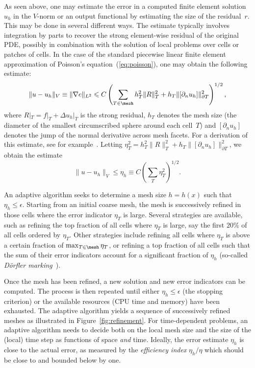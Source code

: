 As seen above, one may estimate the error in a computed finite element
solution~$u_h$ in the $V$-norm or an output functional by estimating
the size of the residual~$r$.  This may be done in several different
ways. The estimate typically involves integration by parts to recover
the strong element-wise residual of the original PDE, possibly in
combination with the solution of local problems over cells or patches
of cells. In the case of the standard piecewise linear finite element
approximation of Poisson's equation~(\ref{eq:poisson}), one may obtain
the following estimate:
\begin{equation}
  \|u - u_h\|_V \equiv \|\nabla e\|_{L^2} \leqslant C
  \left(
  \sum_{T\in\mesh} h_T^2 \|R\|_{T}^2 +
  h_T \|[\partial_n u_h]\|_{\partial T}^2
  \right)^{1/2},
\end{equation}
where $R|_T = f|_T + \Delta u_h|_T$ is the strong residual, $h_T$
denotes the mesh size (the diameter of the smallest circumscribed
sphere around each cell~$T$) and $[\partial_n u_h]$ denotes the jump
of the normal derivative across mesh facets. For a derivation of this
estimate, see for example~\citet{ElmanSilvesterWathen2005}. Letting
$\eta_T^2 = h_T^2 \|R\|_{T}^2 + h_T \|[\partial_n u_h]\|_{\partial
  T}^2$, we obtain the estimate
\begin{equation}
  \|u - u_h\|_V \leqslant \eta_h \equiv C \left( \sum_T \eta_T^2 \right)^{1/2}.
\end{equation}

%
An adaptive algorithm seeks to determine a mesh size $h = h(x)$ such
that $\eta_h \leqslant \epsilon$. Starting from an initial coarse
mesh, the mesh is successively refined in those cells where the error
indicator $\eta_T$ is large. Several strategies are available, such as
refining the top fraction of all cells where $\eta_T$ is large, say
the first $20\%$ of all cells ordered by $\eta_T$. Other strategies
include refining all cells where $\eta_T$ is above a certain fraction
of $\max_{T\in\mesh} \eta_T$, or refining a top fraction of all cells
such that the sum of their error indicators account for a significant
fraction of $\eta_h$ (so-called \emph{D\"orfler
  marking}~\citep{Dorfler1996}).

%
Once the mesh has been refined, a new solution and new error
indicators can be computed. The process is then repeated until either
$\eta_h \leqslant \epsilon$ (the stopping criterion) or the available
resources (CPU time and memory) have been exhausted. The adaptive
algorithm yields a sequence of successively refined meshes as
illustrated in Figure~\ref{fig:refinement}. For time-dependent
problems, an adaptive algorithm needs to decide both on the local mesh
size and the size of the (local) time step as functions of space
\emph{and} time. Ideally, the error estimate $\eta_h$ is close to the
actual error, as measured by the \emph{efficiency index} $\eta_h /
\eta$ which should be close to and bounded below by one.

